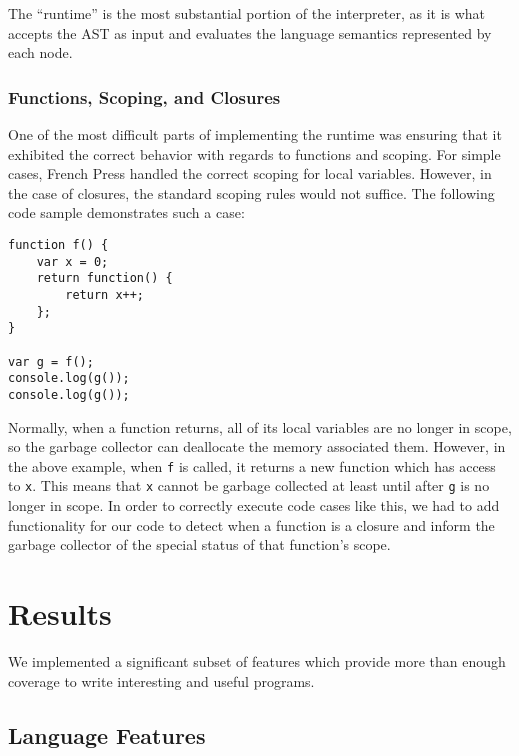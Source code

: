 \documentclass{article}
\begin{document}
\begin{multicols}{2}
The ``runtime'' is the most substantial portion of the interpreter, as it is
what accepts the AST as input and evaluates the language semantics represented
by each node.

\subsubsection*{Functions, Scoping, and Closures}

One of the most difficult parts of implementing the runtime was ensuring that it
exhibited the correct behavior with regards to functions and scoping. For simple
cases, French Press handled the correct scoping for local variables. However,
in the case of closures, the standard scoping rules would not suffice. The
following code sample demonstrates such a case:

\vspace{3mm}

\begin{lstlisting}
function f() {
    var x = 0;
    return function() {
        return x++;
    };
}

var g = f();
console.log(g());
console.log(g());

\end{lstlisting}

\vspace{3mm}

Normally, when a function returns, all of its local variables are no longer in
scope, so the garbage collector can deallocate the memory associated them.
However, in the above example, when \texttt{f} is called, it returns a new
function which has access to \texttt{x}. This means that \texttt{x} cannot
be garbage collected at least until after \texttt{g} is no longer in scope.
In order to correctly execute code cases like this, we had to add functionality
for our code to detect when a function is a closure and inform the garbage
collector of the special status of that function's scope.

\section{Results}

We implemented a significant subset of features which provide more than enough
coverage to write interesting and useful programs.

\subsection{Language Features}


\end{multicols}
\end{document}
